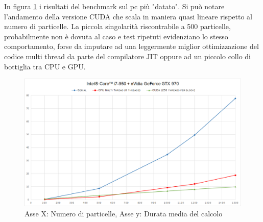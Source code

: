 \documentclass[11pt, a4paper]{article}
\begin{document}
In figura \ref{victor} i risultati del benchmark sul pc più "datato". Si può notare l'andamento della versione CUDA che scala in maniera quasi lineare rispetto al numero di particelle. La piccola singolarità riscontrabile a 500 particelle, probabilmente non è dovuta al caso e test ripetuti evidenziano lo stesso comportamento, forse da imputare ad una leggermente miglior ottimizzazione del codice multi thread da parte del compilatore JIT oppure ad un piccolo collo di bottiglia tra CPU e GPU.

\begin{figure}[ht]
\centering
\includegraphics[width=\textwidth]{images/victorBenchmark.png}
\caption{Asse X: Numero di particelle, Asse y: Durata media del calcolo}
\label{victor}
\end{figure}
\end{document}
